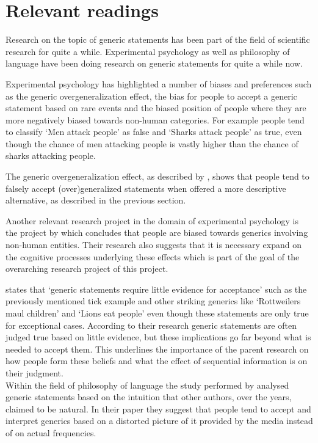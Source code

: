 \documentclass{uva-inf-article}
\begin{document}
\section{Relevant readings}
Research on the topic of generic statements has been part of the field of scientific research for quite a while. Experimental psychology as well as philosophy of language have been doing research on generic statements for quite a while now. 

Experimental psychology has highlighted a number of biases and preferences such as the generic overgeneralization effect, the bias for people to accept a generic statement based on rare events and the biased position of people where they are more negatively biased towards non-human categories. For example people tend to classify `Men attack people' as false and `Sharks attack people' as true, even though the chance of men attacking people is vastly higher than the chance of sharks attacking people. 

The generic overgeneralization effect, as described by \cite{leslie2011all}, shows that people tend to falsely accept (over)generalized statements when offered a more descriptive alternative, as described in the previous section. 

Another relevant research project in the domain of experimental psychology is the project by \cite{tasimi2017differences} which concludes that people are biased towards generics involving non-human entities. Their research also suggests that it is necessary expand on the cognitive processes underlying these effects which is part of the goal of the overarching research project of this project.

\cite{cimpian2010generic} states that `generic statements require little evidence for acceptance' such as the previously mentioned tick example and other striking generics like `Rottweilers maul children' and `Lions eat people' even though these statements are only true for exceptional cases. According to their research generic statements are often judged true based on little evidence, but these implications go far beyond what is needed to accept them. This underlines the importance of the parent research on how people form these beliefs and what the effect of sequential information is on their judgment. \\

Within the field of philosophy of language the study performed by \cite{van2020generics} analysed generic statements based on the intuition that other authors, over the years, claimed to be natural. In their paper they suggest that people tend to accept and interpret generics based on a distorted picture of it provided by the media instead of on actual frequencies.
\end{document}
